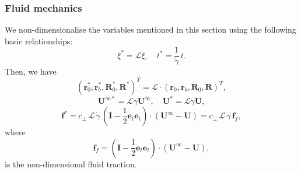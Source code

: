 \documentclass{beamer}
\begin{document}
\begin{frame}
	\frametitle{Fluid mechanics}
	\begin{overlayarea}{\textwidth}{\textheight}
We non-dimensionalise the variables mentioned in this section using the following basic relationships:
\begin{equation*}
	\xi^*=\mathcal{L}\xi, \quad t^*=\frac{1}{\dot{\gamma}}\,t.
\end{equation*}
\vspace{-0.3cm}
Then, we have 
\begin{equation*}
	(\mathbf{r}_0^*, \mathbf{r}_b^*, \mathbf{R}_0^*, \mathbf{R}^*)^T=\mathcal{L}\cdot(\mathbf{r}_0, \mathbf{r}_b, \mathbf{R}_0, \mathbf{R})^T,
\end{equation*}
\begin{equation*}
	\mathbf{U}^{\infty*}=\mathcal{L}\dot{\gamma}\mathbf{U}^{\infty}, \quad \mathbf{U}^*=\mathcal{L}\dot{\gamma}\mathbf{U},
\end{equation*}
\begin{equation*}
	\mathbf{f}^*=c_\perp\,\mathcal{L}\,\dot{\gamma}\,\left(\mathbf{I}-\frac{1}{2}\mathbf{e}_t\mathbf{e}_t\right)\cdot(\mathbf{U}^{\infty}-\mathbf{U})=c_\perp\,\mathcal{L}\,\dot{\gamma}\,\mathbf{f}_{f},
\end{equation*}
where 
\begin{equation*}
	\mathbf{f}_f=\left(\mathbf{I}-\frac{1}{2}\mathbf{e}_t\mathbf{e}_t\right)\cdot(\mathbf{U}^{\infty}-\mathbf{U}),
\end{equation*}
is the non-dimensional fluid traction.
	\end{overlayarea}
\end{frame}

\end{document}
